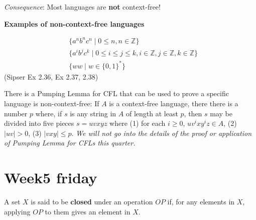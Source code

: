 \documentclass[12pt, oneside]{article}
\begin{document}
{\it Consequence}: Most languages are {\bf not} context-free!

{\bf Examples  of non-context-free languages}

\begin{align*}
    &\{ a^n b^n c^n \mid 0 \leq n , n \in \mathbb{Z}\}\\
    &\{ a^i b^j c^k \mid 0 \leq i \leq j \leq k , i \in \mathbb{Z}, j \in \mathbb{Z}, k \in \mathbb{Z}\}\\
    &\{ ww \mid w \in \{0,1\}^* \}
\end{align*}
(Sipser Ex 2.36, Ex 2.37, 2.38)

There is a Pumping Lemma for CFL that can be used to prove a specific language is non-context-free: 
If $A$ is a context-free language, there there
is a number $p$ where, if $s$ is any string in $A$ of length at least $p$, then $s$ may be divided 
into five pieces $s = uvxyz$ where (1) for each $i \geq 0$, $uv^ixy^iz \in A$, (2) $|uv|>0$, (3) $|vxy| \leq p$.
{\it We will not go into the details of the proof or application of Pumping Lemma for CFLs this quarter.} \vfill
\section*{Week5 friday}


A set $X$ is said to be {\bf closed} under an operation $OP$ if, for any elements in $X$, applying 
$OP$ to them gives an element in $X$.  
\end{document}
